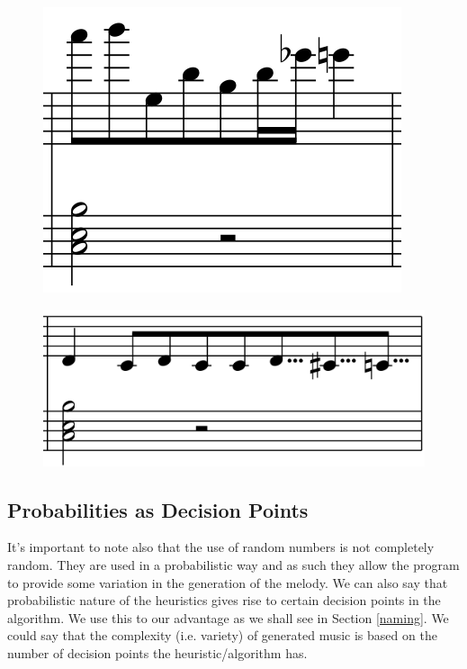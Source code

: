 \documentclass[pdftex,12pt,a4paper]{report}
\begin{document}
\begin{figure}[h]
  \centering
  \includegraphics[scale=0.33]{figure/lookaheadapproach1.png}
  \label{fig:lookaheadapproach1}
\end{figure}

\begin{figure}[h]
  \centering
  \includegraphics[scale=0.35]{figure/lookaheadapproach2.png}
  \label{fig:lookaheadapproach2}
\end{figure}


\subsection{Probabilities as Decision Points} \label{decisionpoints}
It's important to note also that the use of random numbers is not completely random. They are used in a probabilistic way and as such they allow the program to provide some variation in the generation of the melody. We can also say that probabilistic nature of the heuristics gives rise to certain decision points in the algorithm. We use this to our advantage as we shall see in Section \ref{naming}. We could say that the complexity (i.e. variety) of generated music is based on the number of decision points the heuristic/algorithm has. 
\end{document}
